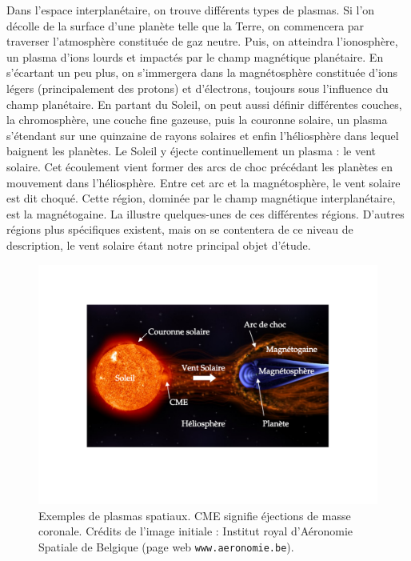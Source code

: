 Dans l'espace interplanétaire, on trouve différents types de plasmas. Si l'on décolle de la surface d'une planète telle que la Terre, on commencera par traverser l'atmosphère constituée de gaz neutre. Puis, on atteindra l'ionosphère, un plasma d'ions lourds et impactés par le champ magnétique planétaire. En s'écartant un peu plus, on s'immergera dans la magnétosphère constituée d'ions légers (principalement des protons) et d'électrons, toujours sous l'influence du champ planétaire. En partant du Soleil, on peut aussi définir différentes couches, la chromosphère, une couche fine gazeuse, puis la couronne solaire, un plasma s'étendant sur une quinzaine de rayons solaires et enfin l'héliosphère dans lequel baignent les planètes. Le Soleil y éjecte continuellement un plasma : le vent solaire.
Cet écoulement vient former des arcs de choc précédant les planètes en mouvement dans l'héliosphère. Entre cet arc et la magnétosphère, le vent solaire est dit choqué. Cette région, dominée par le champ magnétique interplanétaire, est la magnétogaine. La  illustre quelques-unes de ces différentes régions. D'autres régions plus spécifiques existent, mais on se contentera de ce niveau de description, le vent solaire étant notre principal objet d'étude. 
\begin{figure}[!ht]
 \centering
\includegraphics[width=\linewidth,trim=4cm 5cm 4cm 4cm, clip=true]{./Mainmatter/Part_0/images/schemes_heliosphere}
\cprotect\caption{Exemples de plasmas spatiaux. \acs{CME} signifie éjections de masse coronale. Crédits de l'image initiale : Institut royal d'Aéronomie Spatiale de Belgique (page web \verb|www.aeronomie.be|).}
\label{fig:régions}
\end{figure}

